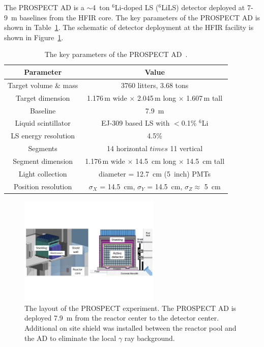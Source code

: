     The PROSPECT AD is a $\sim$4~ton $^{6}$Li-doped LS ($^{6}$LiLS) detector deployed at 7-9~m baselines from the HFIR core.
    The key parameters of the PROSPECT AD is shown in Table~\ref{tab:PROSPECT_AD}.
    The schematic of detector deployment at the HFIR facility is shown in Figure~\ref{fig:PROSPECT_LAYOUT}.
\begin{table}[h]
    \centering
    \caption[PROSPECT AD Parameters]{The key parameters of the PROSPECT AD~\cite{bib:prospect_nim}.}
    \begin{tabular}{cc}
    \hline
    \hline
    Parameter  & Value   \\ 
    \hline
    Target volume \& mass    & 3760 litters, 3.68 tons\\
    Target dimension & 1.176\,m wide $\times$ 2.045\,m long  $\times$ 1.607\,m tall \\
    Baseline     & 7.9~m \\
    Liquid scintillator & EJ-309 based LS with $<$0.1\% $^{6}$Li \\
    LS energy resolution & 4.5\% \\
    Segments & 14 horizontal $times$ 11 vertical \\
    Segment dimension & 1.176\,m wide $\times$ 14.5~cm long  $\times$ 14.5~cm tall \\
    Light collection & diameter = 12.7~cm (5~inch) PMTs\\
    Position resolution & $\sigma_X$ = 14.5~cm,  $\sigma_Y$ = 14.5~cm,  $\sigma_Z \approx$ 5~cm \\
    \hline
    \end{tabular}
    \label{tab:PROSPECT_AD}
\end{table}
\begin{figure}
    \centering
    \includegraphics[width=0.6\textwidth]{Figures/Layout.pdf}
    \caption[The layout of the PROSPECT experiment]{The layout of the PROSPECT experiment.
    The PROSPECT AD is deployed 7.9~m from the reactor center to the detector center.
    Additional on site shield was installed between the reactor pool and the AD to eliminate the local $\gamma$ ray background.
    }
    \label{fig:PROSPECT_LAYOUT}
\end{figure}
    
